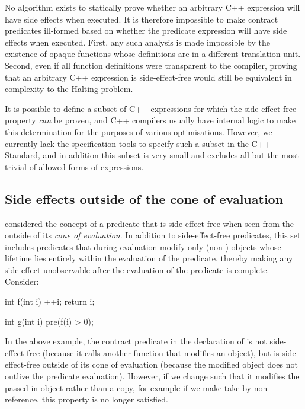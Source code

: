 No algorithm exists to statically prove whether an arbitrary C++ expression will have side effects when executed. It is therefore impossible to make contract predicates ill-formed based on whether the predicate expression will have side effects when executed. First, any such analysis is made impossible by the existence of opaque functions whose definitions are in a different translation unit. Second, even if all function definitions were transparent to the compiler, proving that an arbitrary C++ expression is side-effect-free would still be equivalent in complexity to the Halting problem.

It is possible to define a subset of C++ expressions for which the side-effect-free property \emph{can} be proven, and C++ compilers usually have internal logic to make this determination for the purposes of various optimisations. However, we currently lack the specification tools to specify such a subset in the C++ Standard, and in addition this subset is very small and excludes all but the most trivial of allowed forms of expressions.

\subsection{Side effects outside of the cone of evaluation}
\label{subsec:cone}

\cite{P2680R1} considered the concept of a predicate that is side-effect free when seen from the outside of its \emph{cone of evaluation}. In addition to side-effect-free predicates, this set includes predicates that during evaluation modify only (non-) objects whose lifetime lies entirely within the evaluation of the predicate, thereby making any side effect unobservable after the evaluation of the predicate is complete. Consider:

\pagebreak %
\begin{codeblock}
int f(int i) {
  ++i;
  return i;
}

int g(int i)
  pre(f(i) > 0);
\end{codeblock}

In the above example, the contract predicate in the declaration of  is not side-effect-free (because it calls another function  that modifies an object), but is side-effect-free outside of its cone of evaluation (because the modified object does not outlive the predicate evaluation). However, if we change  such that it modifies the passed-in object rather than a copy, for example if we make  take  by non- reference, this property is no longer satisfied.

